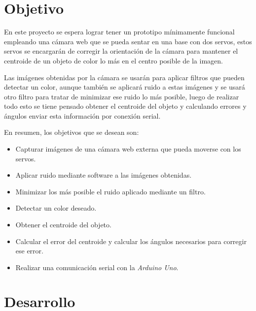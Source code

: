 \documentclass[12pt, oneside]{article}
\begin{document}
\section{Objetivo}
{\sffamily\large\justify
    \hspace{0.5cm} En este proyecto se espera lograr tener un prototipo mínimamente
    funcional empleando una cámara web que se pueda sentar en una base con dos servos,
    estos servos se encargarán de corregir la orientación de la cámara para mantener el
    centroide de un objeto de color lo más en el centro posible de la imagen.

    \hspace{0.5cm} Las imágenes obtenidas por la cámara se usarán para aplicar filtros
    que pueden detectar un color, aunque también se aplicará ruido a estas imágenes y se
    usará otro filtro para tratar de minimizar ese ruido lo más posible, luego de
    realizar todo esto se tiene pensado obtener el centroide del objeto y calculando
    errores y ángulos enviar esta información por conexión serial.

    \hspace{0.5cm} En resumen, los objetivos que se desean son:
    \renewcommand{\labelitemi}{$\bullet$}
    \begin{itemize}
        \item Capturar imágenes de una cámara web externa que pueda moverse con los
            servos.
        \item Aplicar ruido mediante software a las imágenes obtenidas.
        \item Minimizar los más posible el ruido aplicado mediante un filtro.
        \item Detectar un color deseado.
        \item Obtener el centroide del objeto.
        \item Calcular el error del centroide y calcular los ángulos necesarios para
            corregir ese error.
        \item Realizar una comunicación serial con la \emph{Arduino Uno}.
    \end{itemize}

}

\newpage
\section{Desarrollo}
\end{document}

